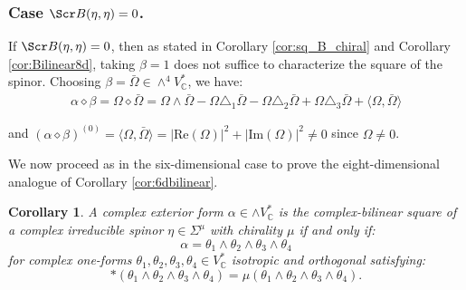 \documentclass[10pt,a4paper,twoside,reqno]{amsart}
\theoremstyle{plain}
\newtheorem{cor}[thm]{Corollary}
\theoremstyle{definition}
\theoremstyle{remark}
\def\C{\mathbb{C}}
\def\scB{\Scr B}
\def\Re{\mathrm{Re}}
\def\Im{\mathrm{Im}}
\newcommand{\abs}[1]{\left\lvert#1\right\rvert}
\newcommand{\escal}[1]{\langle#1\rangle}
\begin{document}

\subsubsection{Case $\scB(\eta,\eta)=0$.}

 
If $\scB(\eta,\eta) = 0$, then as stated in Corollary \ref{cor:sq_B_chiral} and Corollary \ref{cor:Bilinear8d}, taking $\beta=1$ does not suffice to characterize the square of the spinor. Choosing $\beta = \bar\Omega \in \wedge^4V^*_\C$, we have: 
\begin{eqnarray*}
\alpha\diamond\beta=\Omega\diamond\bar\Omega=\Omega\wedge\bar\Omega-\Omega\triangle_1\bar\Omega-\Omega\triangle_2\bar\Omega+\Omega\triangle_3\bar\Omega+\escal{\Omega,\bar\Omega}
\end{eqnarray*}

\noindent
and $(\alpha\diamond\beta)^{(0)}=\escal{\Omega,\bar\Omega}=\abs{\Re(\Omega)}^2+\abs{\Im(\Omega)}^2\neq0$ since $\Omega\neq0$.\medskip

We now proceed as in the six-dimensional case to prove the eight-dimensional analogue of Corollary \ref{cor:6dbilinear}.

\begin{cor}
A complex exterior form $\alpha\in\wedge V^*_\C$ is the complex-bilinear square of a complex irreducible spinor $\eta\in\Sigma^\mu$ with chirality $\mu$ if and only if: $$\alpha=\theta_1\wedge\theta_2\wedge\theta_3\wedge\theta_4$$ for complex one-forms $\theta_1,\theta_2,\theta_3,\theta_4\in V^*_\C$ isotropic and orthogonal satisfying: $$*(\theta_1\wedge\theta_2\wedge\theta_3\wedge\theta_4)=\mu(\theta_1\wedge\theta_2\wedge\theta_3\wedge\theta_4).$$
\end{cor}
\end{document}
